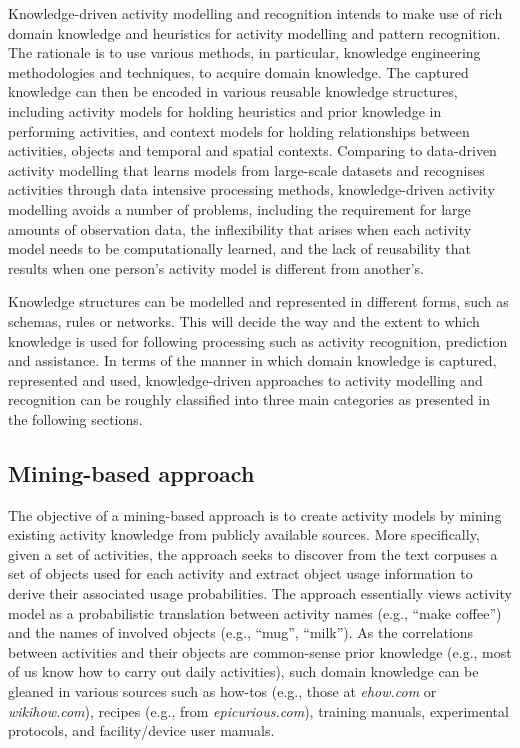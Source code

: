 Knowledge-driven activity modelling and recognition intends to make use of rich domain knowledge and heuristics for activity modelling and pattern recognition. The rationale is to use various methods, in particular, knowledge engineering methodologies and techniques, to acquire domain knowledge. The captured knowledge can then be encoded in various reusable knowledge structures, including activity models for holding heuristics and prior knowledge in performing activities, and context models for holding relationships between activities, objects and temporal and spatial contexts. Comparing to data-driven activity modelling that learns models from large-scale datasets and recognises activities through data intensive processing methods, knowledge-driven activity modelling avoids a number of problems, including the requirement for large amounts of observation data, the inflexibility that arises when each activity model needs to be computationally learned, and the lack of reusability that results when one person’s activity model is different from another’s. 

Knowledge structures can be modelled and represented in different forms, such as schemas, rules or networks. This will decide the way and the extent to which knowledge is used for following processing such as activity recognition, prediction and assistance. In terms of the manner in which domain knowledge is captured, represented and used, knowledge-driven approaches to activity modelling and recognition can be roughly classified into three main categories as presented in the following sections.

\subsection{Mining-based approach}

The objective of a mining-based approach is to create activity models by mining existing activity knowledge from publicly available sources. More specifically, given a set of activities, the approach seeks to discover from the text corpuses a set of objects used for each activity and extract object usage information to derive their associated usage probabilities. The approach essentially views activity model as a probabilistic translation between activity names (e.g., “make coffee”) and the names of involved objects (e.g., “mug”, “milk”). As the correlations between activities and their objects are common-sense prior knowledge (e.g., most of us know how to carry out daily activities), such domain knowledge can be gleaned in various sources such as how-tos (e.g., those at \textit{ehow.com} or \textit{wikihow.com}), recipes (e.g., from \textit{epicurious.com}), training manuals, experimental protocols, and facility/device user manuals.

